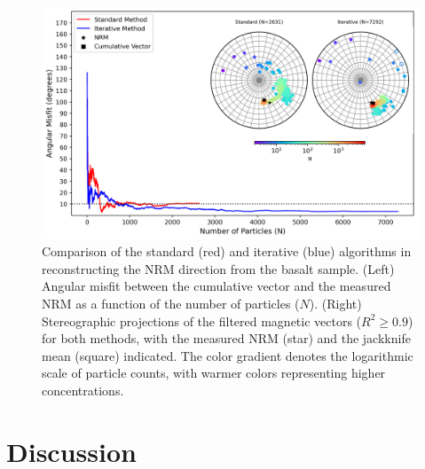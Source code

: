 \begin{figure}[tb!]
  \centering
  \includegraphics[width=1\linewidth]{paper/figures/basalt-data-stereoplot.png}
  \caption{
  Comparison of the standard (red) and iterative (blue) algorithms in reconstructing the NRM direction from the basalt sample. (Left) Angular misfit between the cumulative vector and the measured NRM as a function of the number of particles ($N$). (Right) Stereographic projections of the filtered magnetic vectors ($R^2 \geq 0.9$) for both methods, with the measured NRM (star) and the jackknife mean (square) indicated. The color gradient denotes the logarithmic scale of particle counts, with warmer colors representing higher concentrations.
  }
  \label{basalt-data-stereograms}
\end{figure}

\section{Discussion}

